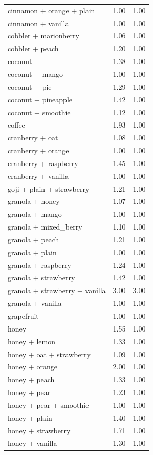\begin{table}
\begin{tabular}{lrr}
cinnamon + orange + plain & 1.00 & 1.00 \\
cinnamon + vanilla & 1.00 & 1.00 \\
cobbler + marionberry & 1.06 & 1.00 \\
cobbler + peach & 1.20 & 1.00 \\
coconut & 1.38 & 1.00 \\
coconut + mango & 1.00 & 1.00 \\
coconut + pie & 1.29 & 1.00 \\
coconut + pineapple & 1.42 & 1.00 \\
coconut + smoothie & 1.12 & 1.00 \\
coffee & 1.93 & 1.00 \\
cranberry + oat & 1.08 & 1.00 \\
cranberry + orange & 1.00 & 1.00 \\
cranberry + raspberry & 1.45 & 1.00 \\
cranberry + vanilla & 1.00 & 1.00 \\
goji + plain + strawberry & 1.21 & 1.00 \\
granola + honey & 1.07 & 1.00 \\
granola + mango & 1.00 & 1.00 \\
granola + mixed\_berry & 1.10 & 1.00 \\
granola + peach & 1.21 & 1.00 \\
granola + plain & 1.00 & 1.00 \\
granola + raspberry & 1.24 & 1.00 \\
granola + strawberry & 1.42 & 1.00 \\
granola + strawberry + vanilla & 3.00 & 3.00 \\
granola + vanilla & 1.00 & 1.00 \\
grapefruit & 1.00 & 1.00 \\
honey & 1.55 & 1.00 \\
honey + lemon & 1.33 & 1.00 \\
honey + oat + strawberry & 1.09 & 1.00 \\
honey + orange & 2.00 & 1.00 \\
honey + peach & 1.33 & 1.00 \\
honey + pear & 1.23 & 1.00 \\
honey + pear + smoothie & 1.00 & 1.00 \\
honey + plain & 1.40 & 1.00 \\
honey + strawberry & 1.71 & 1.00 \\
honey + vanilla & 1.30 & 1.00 \\

\end{tabular}
\end{table}
